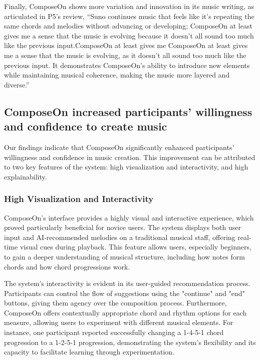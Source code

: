 Finally, ComposeOn shows more variation and innovation in its music writing, as articulated in P5's review, “Suno continues music that feels like it's repeating the same chords and melodies without advancing or developing; ComposeOn at least gives me a sense that the music is evolving because it doesn't all sound too much like the previous input.ComposeOn at least gives me ComposeOn at least gives me a sense that the music is evolving, as it doesn't all sound too much like the previous input. It demonstrates ComposeOn's ability to introduce new elements while maintaining musical coherence, making the music more layered and diverse.”

\subsection{ComposeOn increased participants' willingness and confidence to create music}

Our findings indicate that ComposeOn significantly enhanced participants' willingness and confidence in music creation. This improvement can be attributed to two key features of the system: high visualization and interactivity, and high explainability.

\subsubsection{High Visualization and Interactivity}

ComposeOn's interface provides a highly visual and interactive experience, which proved particularly beneficial for novice users. The system displays both user input and AI-recommended melodies on a traditional musical staff, offering real-time visual cues during playback. This feature allows users, especially beginners, to gain a deeper understanding of musical structure, including how notes form chords and how chord progressions work.

The system's interactivity is evident in its user-guided recommendation process. Participants can control the flow of suggestions using the "continue" and "end" buttons, giving them agency over the composition process. Furthermore, ComposeOn offers contextually appropriate chord and rhythm options for each measure, allowing users to experiment with different musical elements. For instance, one participant reported successfully changing a 1-4-5-1 chord progression to a 1-2-5-1 progression, demonstrating the system's flexibility and its capacity to facilitate learning through experimentation.

